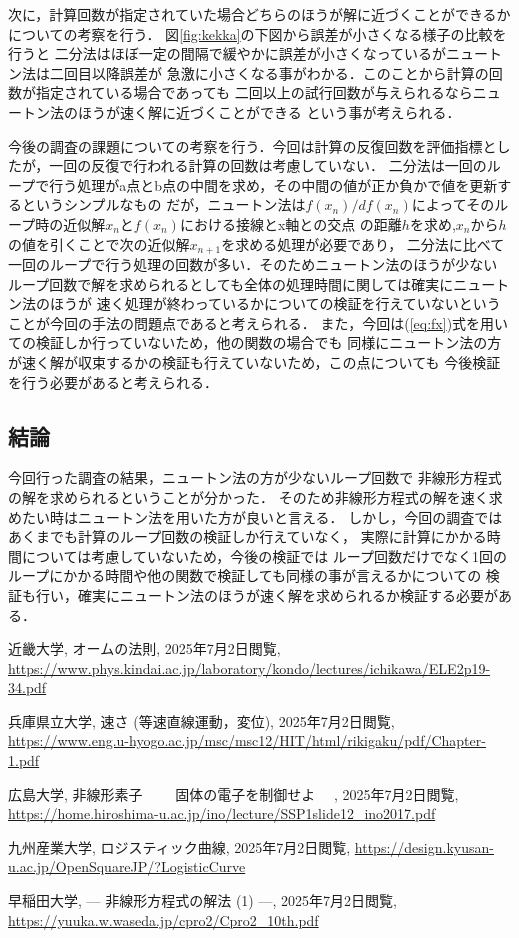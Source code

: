 \documentclass[uplatex]{jsarticle}
\begin{document}
次に，計算回数が指定されていた場合どちらのほうが解に近づくことができるかについての考察を行う．
図\ref{fig:kekka}の下図から誤差が小さくなる様子の比較を行うと
二分法はほぼ一定の間隔で緩やかに誤差が小さくなっているがニュートン法は二回目以降誤差が
急激に小さくなる事がわかる．このことから計算の回数が指定されている場合であっても
二回以上の試行回数が与えられるならニュートン法のほうが速く解に近づくことができる
という事が考えられる．

今後の調査の課題についての考察を行う．今回は計算の反復回数を評価指標としたが，一回の反復で行われる計算の回数は考慮していない．
二分法は一回のループで行う処理がa点とb点の中間を求め，その中間の値が正か負かで値を更新するというシンプルなもの
だが，ニュートン法は$f(x_n) / df(x_n)$によってそのループ時の近似解$x_n$と$f(x_n)$における接線とx軸との交点
の距離$h$を求め,$x_n$から$h$の値を引くことで次の近似解$x_{n+1}$を求める処理が必要であり，
二分法に比べて一回のループで行う処理の回数が多い．そのためニュートン法のほうが少ない
ループ回数で解を求められるとしても全体の処理時間に関しては確実にニュートン法のほうが
速く処理が終わっているかについての検証を行えていないということが今回の手法の問題点であると考えられる．
また，今回は(\ref{eq:fx})式を用いての検証しか行っていないため，他の関数の場合でも
同様にニュートン法の方が速く解が収束するかの検証も行えていないため，この点についても
今後検証を行う必要があると考えられる．

\subsection{結論}
今回行った調査の結果，ニュートン法の方が少ないループ回数で
非線形方程式の解を求められるということが分かった．
そのため非線形方程式の解を速く求めたい時はニュートン法を用いた方が良いと言える．
しかし，今回の調査ではあくまでも計算のループ回数の検証しか行えていなく，
実際に計算にかかる時間については考慮していないため，今後の検証では
ループ回数だけでなく1回のループにかかる時間や他の関数で検証しても同様の事が言えるかについての
検証も行い，確実にニュートン法のほうが速く解を求められるか検証する必要がある．

\begin{thebibliography}{5}

 近畿大学, オームの法則,
2025年7月2日閲覧, \url{https://www.phys.kindai.ac.jp/laboratory/kondo/lectures/ichikawa/ELE2p19-34.pdf}

 兵庫県立大学, 速さ (等速直線運動，変位),
2025年7月2日閲覧, \url{https://www.eng.u-hyogo.ac.jp/msc/msc12/HIT/html/rikigaku/pdf/Chapter-1.pdf}


 広島大学, 非線形素子　~~ 固体の電子を制御せよ ~~, 
2025年7月2日閲覧, \url{https://home.hiroshima-u.ac.jp/ino/lecture/SSP1slide12_ino2017.pdf}


 九州産業大学, ロジスティック曲線, 
2025年7月2日閲覧, \url{https://design.kyusan-u.ac.jp/OpenSquareJP/?LogisticCurve}


 早稲田大学, — 非線形方程式の解法 (1) —, 
2025年7月2日閲覧, \url{https://yuuka.w.waseda.jp/cpro2/Cpro2_10th.pdf}

\end{thebibliography}
\end{document}
